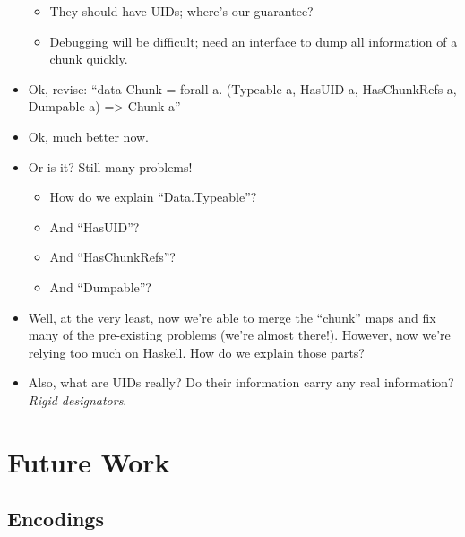 \begin{itemize}
\begin{itemize}
                  \item They should have UIDs; where's our guarantee?

                  \item Debugging will be difficult; need an interface to dump all
                        information of a chunk quickly.

            \end{itemize}

      \item Ok, revise: ``data Chunk = forall a. (Typeable a, HasUID a,
            HasChunkRefs a, Dumpable a) => Chunk a''

      \item Ok, much better now.

      \item Or is it? Still many problems!
            \begin{itemize}

                  \item How do we explain ``Data.Typeable''?

                  \item And ``HasUID''?

                  \item And ``HasChunkRefs''?

                  \item And ``Dumpable''?

            \end{itemize}

      \item Well, at the very least, now we're able to merge the ``chunk'' maps and
            fix many of the pre-existing problems (we're almost there!). However,
            now we're relying too much on Haskell. How do we explain those parts?

      \item Also, what are UIDs really? Do their information carry any real
            information? \textit{Rigid designators}.

\end{itemize}

\section{Future Work}

\subsection{Encodings}

